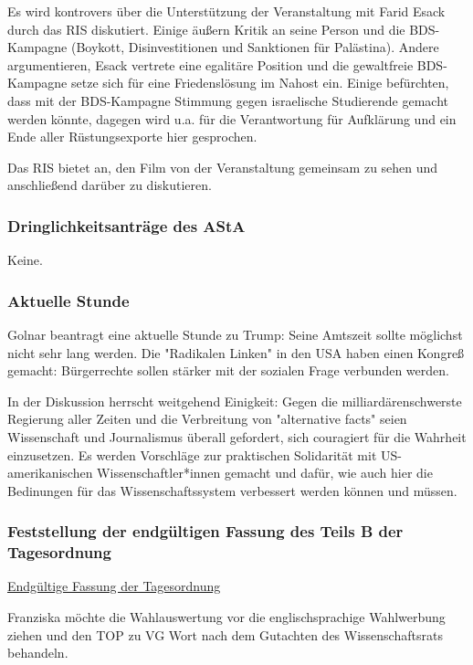 \documentclass[ngerman,headheight=70pt]{scrartcl}
\begin{document}
    Es wird kontrovers über die Unterstützung der Veranstaltung mit Farid Esack
    durch das RIS diskutiert. Einige äußern Kritik an seine Person und die
    BDS-Kampagne (Boykott, Disinvestitionen und Sanktionen für Palästina). Andere
    argumentieren, Esack vertrete eine egalitäre Position und die gewaltfreie
    BDS-Kampagne setze sich für eine Friedenslösung im Nahost ein. Einige
    befürchten, dass mit der BDS-Kampagne Stimmung gegen israelische Studierende
    gemacht werden könnte, dagegen wird u.a. für die Verantwortung für Aufklärung
    und ein Ende aller Rüstungsexporte hier gesprochen.

    Das RIS bietet an, den Film von der Veranstaltung gemeinsam zu sehen und
    anschließend darüber zu diskutieren.

    \subsubsection{Dringlichkeitsanträge des AStA}

    Keine.

    \subsubsection{Aktuelle Stunde}

    Golnar beantragt eine aktuelle Stunde zu Trump: Seine Amtszeit sollte
    möglichst nicht sehr lang werden. Die "Radikalen Linken" in den USA haben
    einen Kongreß gemacht: Bürgerrechte sollen stärker mit der sozialen Frage
    verbunden werden.

    In der Diskussion herrscht weitgehend Einigkeit: Gegen die
    milliardärenschwerste Regierung aller Zeiten und die Verbreitung von
    "alternative facts" seien Wissenschaft und Journalismus überall gefordert,
    sich couragiert für die Wahrheit einzusetzen. Es werden Vorschläge zur
    praktischen Solidarität mit US-amerikanischen Wissenschaftler*innen gemacht
    und dafür, wie auch hier die Bedinungen für das Wissenschaftssystem
    verbessert werden können und müssen.

    \newpage
    \subsubsection{Feststellung der endgültigen Fassung des Teils B der Tagesordnung}

    \underline{Endgültige Fassung der Tagesordnung}

    Franziska möchte die Wahlauswertung vor die englischsprachige Wahlwerbung
    ziehen und den TOP zu VG Wort nach dem Gutachten des Wissenschaftsrats
    behandeln.
\end{document}
